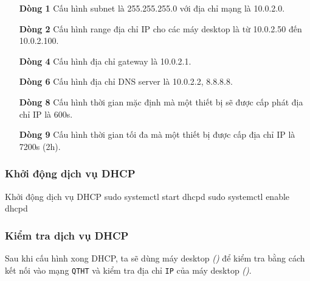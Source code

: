 \begin{itemize}
  \item [\textbf{Dòng 1}] Cấu hình subnet là 255.255.255.0 với địa chỉ mạng là 10.0.2.0.
  \item [\textbf{Dòng 2}] Cấu hình range địa chỉ IP cho các máy desktop là từ 10.0.2.50 đến 10.0.2.100.
  \item [\textbf{Dòng 4}] Cấu hình địa chỉ gateway là 10.0.2.1.
  \item [\textbf{Dòng 6}] Cấu hình địa chỉ DNS server là 10.0.2.2, 8.8.8.8.
  \item [\textbf{Dòng 8}] Cấu hình thời gian mặc định mà một thiết bị sẽ được cấp phát địa chỉ IP là 600s.
  \item [\textbf{Dòng 9}] Cấu hình thời gian tối đa mà một thiết bị được cấp địa chỉ IP là 7200s (2h).
\end{itemize}

\subsubsection{Khởi động dịch vụ DHCP}


\vspace{0.5cm}
\begin{bashlisting}{Khởi động dịch vụ DHCP}
  sudo systemctl start dhcpd
  sudo systemctl enable dhcpd
\end{bashlisting}

\subsubsection{Kiểm tra dịch vụ DHCP}

Sau khi cấu hình xong DHCP, ta sẽ dùng máy desktop \textit{()} để kiểm tra bằng cách kết nối vào mạng \texttt{QTHT} và kiểm tra địa chỉ \texttt{IP}
của máy desktop \textit{()}.


